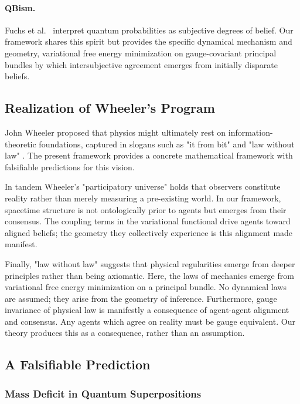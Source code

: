 \documentclass[11pt]{article}
\begin{document}
\paragraph{QBism.} Fuchs et al.\ \cite{Fuchs2014} interpret quantum 
probabilities as subjective degrees of belief. Our framework shares this spirit but provides the specific dynamical mechanism and geometry, variational free energy minimization on gauge-covariant principal bundles by which intersubjective agreement emerges from initially disparate beliefs.


\subsection{Realization of Wheeler's Program}

John Wheeler proposed that physics might ultimately rest on information-theoretic foundations, captured in slogans such as "it from bit" and "law without law" \cite{Wheeler1990}. The present framework provides a concrete mathematical framework with falsifiable predictions for this vision.

In tandem Wheeler's "participatory universe" holds that observers constitute reality rather than merely measuring a pre-existing world. In our framework, spacetime structure is not ontologically prior to agents but emerges from their consensus. The coupling terms in the variational functional drive agents toward aligned beliefs; the geometry they collectively experience is this alignment made manifest.

Finally, "law without law" suggests that physical regularities emerge from deeper principles rather than being axiomatic. Here, the laws of mechanics emerge from variational free energy minimization on a principal bundle. No dynamical laws are assumed; they arise from the geometry of inference. Furthermore, gauge invariance of physical law is manifestly a consequence of agent-agent alignment and consensus.  Any agents which agree on reality must be gauge equivalent.  Our theory produces this as a consequence, rather than an assumption.


\subsection{A Falsifiable Prediction}

\subsubsection{Mass Deficit in Quantum Superpositions}
\end{document}
